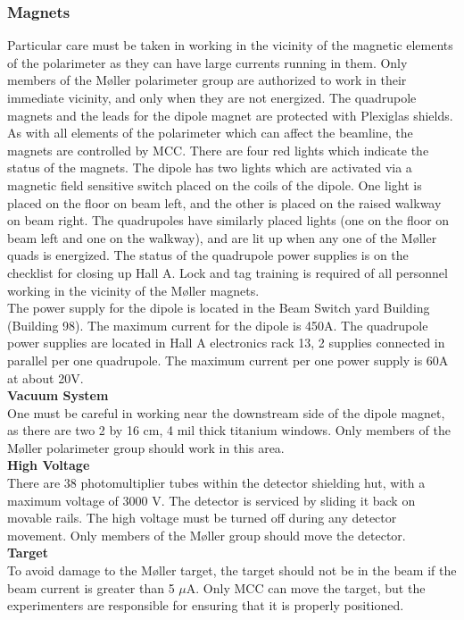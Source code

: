 \begin{safetyen}{50}{50}
\subsubsection{Magnets}

Particular care must be taken in working in the vicinity of the
magnetic elements of the polarimeter as they can have large currents
running in them. Only members of the M{\o}ller polarimeter group are
authorized to work in their immediate vicinity, and only when they are
not energized. The quadrupole magnets and the leads for the dipole magnet 
are protected with Plexiglas shields. As with all elements of the
polarimeter which can
affect the beamline, the magnets are controlled by MCC. There are four
red lights which indicate the status of the magnets. The dipole has two
lights which are activated via a magnetic field sensitive switch placed
on the coils of the dipole. One light is placed on the floor on beam left,
and the other is placed on the raised walkway on beam right. The quadrupoles
have similarly placed lights (one on the floor on beam left and one
on the walkway), and are lit up when any one of the M{\o}ller quads is 
energized. The status of the quadrupole power supplies is on the 
checklist for
closing up Hall A. Lock and tag training is required of all personnel working
in the vicinity of the M{\o}ller magnets. \\ 

The power supply for
the dipole is located in the Beam Switch yard Building (Building 98). 
The maximum current for the dipole is 450A.
The quadrupole power supplies are located in Hall A electronics rack 13,
2 supplies connected in parallel per one quadrupole. The maximum
current per one power supply is 60A at about 20V. 
\\

\noindent
{\bf Vacuum System}\\

One must be careful in working near the downstream side of the dipole
magnet, as there are two 2 by 16 cm, 4 mil thick titanium windows.
Only members of the M{\o}ller polarimeter group should work in this
area.\\

\noindent
{\bf High Voltage}\\

There are 38 photomultiplier tubes within the detector
shielding hut, with a maximum voltage of 3000 V. The detector is serviced
by sliding it back on movable rails. The high voltage must be turned
off during any detector movement. Only members of the M{\o}ller group
should move the detector.\\

\noindent
{\bf Target}\\

To avoid damage to the M{\o}ller target, the target should not be in the beam 
if the beam current is greater than
5 $\mu$A. Only MCC can move the target, but the experimenters
are responsible for ensuring that it is properly positioned.\\
\end{safetyen}


